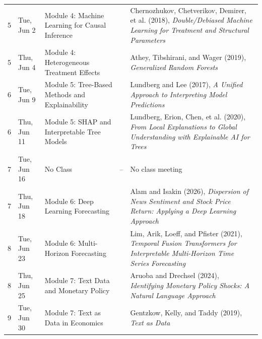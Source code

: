 \documentclass[11pt]{article}
\begin{document}
\begin{adjustbox}{max width=\textwidth, max totalheight=0.84\textheight, keepaspectratio}
\begin{tabularx}{\textwidth}{@{}L{0.045\textwidth} L{0.075\textwidth} L{0.20\textwidth} L{0.13\textwidth} X@{}}
5 & Tue, Jun 2 & Module 4: Machine Learning for Causal Inference & \underline{\hspace{2.1cm}} & Chernozhukov, Chetverikov, Demirer, et al. (2018), \textit{Double/Debiased Machine Learning for Treatment and Structural Parameters} \\

5 & Thu, Jun 4 & Module 4: Heterogeneous Treatment Effects & \underline{\hspace{2.1cm}} & Athey, Tibshirani, and Wager (2019), \textit{Generalized Random Forests} \\

6 & Tue, Jun 9 & Module 5: Tree-Based Methods and Explainability & \underline{\hspace{2.1cm}} & Lundberg and Lee (2017), \textit{A Unified Approach to Interpreting Model Predictions} \\

6 & Thu, Jun 11 & Module 5: SHAP and Interpretable Tree Models & \underline{\hspace{2.1cm}} & Lundberg, Erion, Chen, et al. (2020), \textit{From Local Explanations to Global Understanding with Explainable AI for Trees} \\

7 & Tue, Jun 16 & No Class & -- & No class meeting \\

7 & Thu, Jun 18 & Module 6: Deep Learning Forecasting & \underline{\hspace{2.1cm}} & Alam and Isakin (2026), \textit{Dispersion of News Sentiment and Stock Price Return: Applying a Deep Learning Approach} \\

8 & Tue, Jun 23 & Module 6: Multi-Horizon Forecasting & \underline{\hspace{2.1cm}} & Lim, Arik, Loeff, and Pfister (2021), \textit{Temporal Fusion Transformers for Interpretable Multi-Horizon Time Series Forecasting} \\

8 & Thu, Jun 25 & Module 7: Text Data and Monetary Policy & \underline{\hspace{2.1cm}} & Aruoba and Drechsel (2024), \textit{Identifying Monetary Policy Shocks: A Natural Language Approach} \\

9 & Tue, Jun 30 & Module 7: Text as Data in Economics & \underline{\hspace{2.1cm}} & Gentzkow, Kelly, and Taddy (2019), \textit{Text as Data} \\


\end{tabularx}
\end{adjustbox}
\end{document}
